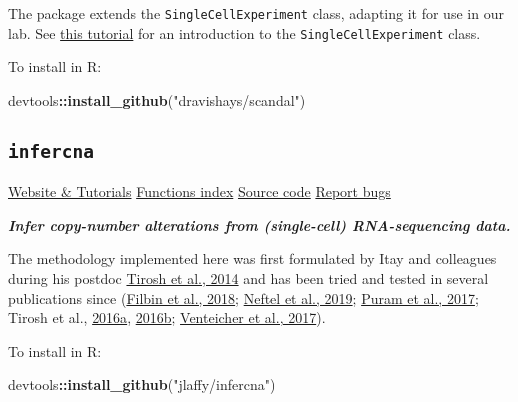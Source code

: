 \documentclass[]{book}
\newenvironment{Shaded}{\begin{snugshade}}{\end{snugshade}}
\newcommand{\KeywordTok}[1]{\textcolor[rgb]{0.13,0.29,0.53}{\textbf{#1}}}
\newcommand{\StringTok}[1]{\textcolor[rgb]{0.31,0.60,0.02}{#1}}
\newcommand{\OperatorTok}[1]{\textcolor[rgb]{0.81,0.36,0.00}{\textbf{#1}}}
\newcommand{\NormalTok}[1]{#1}
\begin{document}
The package extends the \texttt{SingleCellExperiment} class, adapting it
for use in our lab. See
\href{https://www.bioconductor.org/packages/release/bioc/vignettes/SingleCellExperiment/inst/doc/intro.html}{this
tutorial} for an introduction to the \texttt{SingleCellExperiment}
class.

To install in R:

\begin{Shaded}
\begin{Highlighting}[]
\NormalTok{devtools}\OperatorTok{::}\KeywordTok{install_github}\NormalTok{(}\StringTok{"dravishays/scandal"}\NormalTok{)}
\end{Highlighting}
\end{Shaded}

\subsection{\texorpdfstring{\texttt{infercna}}{infercna}}\label{infercna}

\href{https://jlaffy.github.io/infercna}{Website \& Tutorials}
\textbar{}
\href{https://jlaffy.github.io/infercna/reference/index.html}{Functions
index} \textbar{} \href{https://github.com/jlaffy/infercna}{Source code}
\textbar{} \href{https://github.com/jlaffy/infercna/issues}{Report bugs}

\emph{\textbf{Infer copy-number alterations from (single-cell)
RNA-sequencing data.}}

The methodology implemented here was first formulated by Itay and
colleagues during his postdoc
\href{https://science.sciencemag.org/content/344/6190/1396.long}{Tirosh
et al., 2014} and has been tried and tested in several publications
since
(\href{https://science.sciencemag.org/content/360/6386/331.long}{Filbin
et al., 2018};
\href{https://www.ncbi.nlm.nih.gov/pubmed/31327527}{Neftel et al.,
2019}; \href{https://www.ncbi.nlm.nih.gov/pubmed/29198524}{Puram et al.,
2017}; Tirosh et al.,
\href{https://science.sciencemag.org/content/352/6282/189.long}{2016a},
\href{https://www.nature.com/articles/nature20123}{2016b};
\href{https://science.sciencemag.org/content/355/6332/eaai8478.long}{Venteicher
et al., 2017}).

To install in R:

\begin{Shaded}
\begin{Highlighting}[]
\NormalTok{devtools}\OperatorTok{::}\KeywordTok{install_github}\NormalTok{(}\StringTok{"jlaffy/infercna"}\NormalTok{)}
\end{Highlighting}
\end{Shaded}
\end{document}
